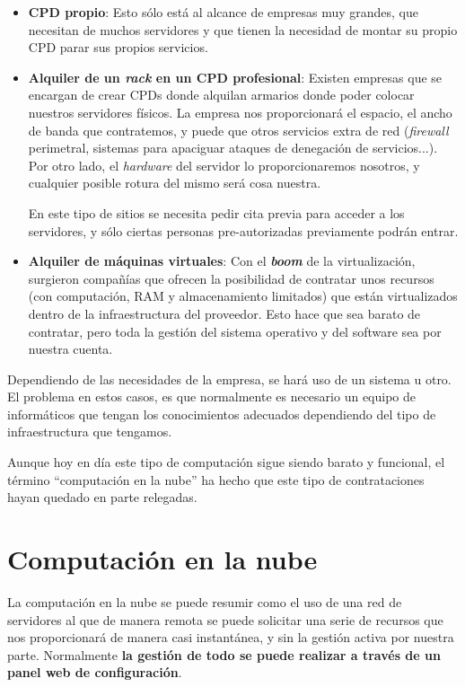 \begin{itemize}
    \item \textbf{CPD propio}: Esto sólo está al alcance de empresas muy grandes, que necesitan de muchos servidores y que tienen la necesidad de montar su propio CPD parar sus propios servicios.

    \item \textbf{Alquiler de un \textit{rack} en un CPD profesional}: Existen empresas que se encargan de crear CPDs donde alquilan armarios donde poder colocar nuestros servidores físicos. La empresa nos proporcionará el espacio, el ancho de banda que contratemos, y puede que otros servicios extra de red (\textit{firewall} perimetral, sistemas para apaciguar ataques de denegación de servicios...). Por otro lado, el \textit{hardware} del servidor lo proporcionaremos nosotros, y cualquier posible rotura del mismo será cosa nuestra.

    En este tipo de sitios se necesita pedir cita previa para acceder a los servidores, y sólo ciertas personas pre-autorizadas previamente podrán entrar. 

    \item \textbf{Alquiler de máquinas virtuales}: Con el \textbf{\textit{boom}} de la virtualización, surgieron compañías que ofrecen la posibilidad de contratar unos recursos (con computación, RAM y almacenamiento limitados) que están virtualizados dentro de la infraestructura del proveedor. Esto hace que sea barato de contratar, pero toda la gestión del sistema operativo y del software sea por nuestra cuenta.
\end{itemize}


Dependiendo de las necesidades de la empresa, se hará uso de un sistema u otro. El problema en estos casos, es que normalmente es necesario un equipo de informáticos que tengan los conocimientos adecuados dependiendo del tipo de infraestructura que tengamos.

Aunque hoy en día este tipo de computación sigue siendo barato y funcional, el término “computación en la nube” ha hecho que este tipo de contrataciones hayan quedado en parte relegadas.



\chapter{Computación en la nube}

La computación en la nube se puede resumir como el uso de una red de servidores al que de manera remota se puede solicitar una serie de recursos que nos proporcionará de manera casi instantánea, y sin la gestión activa por nuestra parte. Normalmente \textbf{la gestión de todo se puede realizar a través de un panel web de configuración}.

